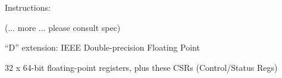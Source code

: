 \documentclass{article}
\begin{document}
\begin{center}
\end{center}

\vspace*{0.1in}

{\LARGE Instructions:}

\begin{center}

  \vspace*{1ex}

  {\Large (... more ... please consult spec)}
  \vspace*{0.2in}

\end{center}

\clearpage


\begin{center}
{\Huge
  ``D'' extension: IEEE Double-precision Floating Point}
\end{center}

\vspace*{0.1in}

{\LARGE 32 x 64-bit floating-point registers, plus these CSRs (Control/Status Regs)}
\end{document}
